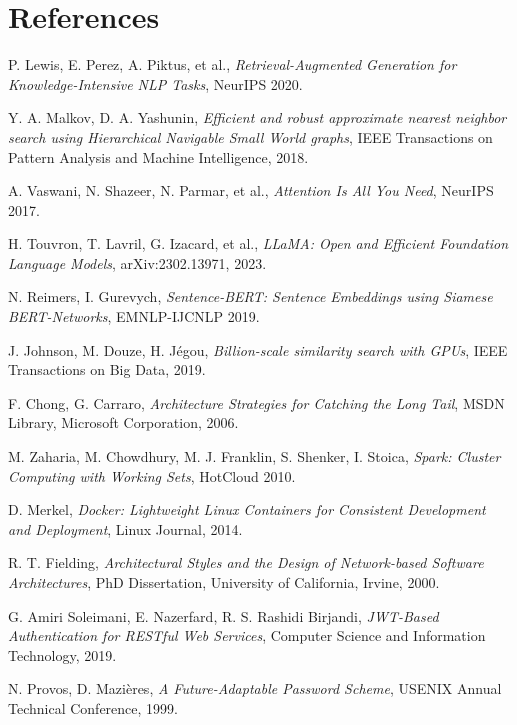 \documentclass[12pt]{report}
\begin{document}
\chapter*{References \hfill} 
\begin{enumerate}
    \bibitem{[1]} P. Lewis, E. Perez, A. Piktus, et al., \emph{Retrieval-Augmented Generation for Knowledge-Intensive NLP Tasks}, NeurIPS 2020.
    
    \bibitem{[2]} Y. A. Malkov, D. A. Yashunin, \emph{Efficient and robust approximate nearest neighbor search using Hierarchical Navigable Small World graphs}, IEEE Transactions on Pattern Analysis and Machine Intelligence, 2018.
    
    \bibitem{[3]} A. Vaswani, N. Shazeer, N. Parmar, et al., \emph{Attention Is All You Need}, NeurIPS 2017.
    
    \bibitem{[4]} H. Touvron, T. Lavril, G. Izacard, et al., \emph{LLaMA: Open and Efficient Foundation Language Models}, arXiv:2302.13971, 2023.
    
    \bibitem{[5]} N. Reimers, I. Gurevych, \emph{Sentence-BERT: Sentence Embeddings using Siamese BERT-Networks}, EMNLP-IJCNLP 2019.
    
    \bibitem{[6]} J. Johnson, M. Douze, H. Jégou, \emph{Billion-scale similarity search with GPUs}, IEEE Transactions on Big Data, 2019.
    
    \bibitem{[7]} F. Chong, G. Carraro, \emph{Architecture Strategies for Catching the Long Tail}, MSDN Library, Microsoft Corporation, 2006.
    
    \bibitem{[8]} M. Zaharia, M. Chowdhury, M. J. Franklin, S. Shenker, I. Stoica, \emph{Spark: Cluster Computing with Working Sets}, HotCloud 2010.
    
    \bibitem{[9]} D. Merkel, \emph{Docker: Lightweight Linux Containers for Consistent Development and Deployment}, Linux Journal, 2014.
    
    \bibitem{[10]} R. T. Fielding, \emph{Architectural Styles and the Design of Network-based Software Architectures}, PhD Dissertation, University of California, Irvine, 2000.
    
    \bibitem{[11]} G. Amiri Soleimani, E. Nazerfard, R. S. Rashidi Birjandi, \emph{JWT-Based Authentication for RESTful Web Services}, Computer Science and Information Technology, 2019.
    
    \bibitem{[12]} N. Provos, D. Mazières, \emph{A Future-Adaptable Password Scheme}, USENIX Annual Technical Conference, 1999.
    

\end{enumerate}
\end{document}
